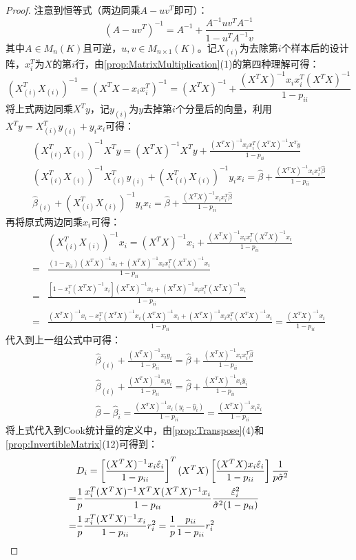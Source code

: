 \begin{proof}
	注意到恒等式（两边同乘$A-uv^T$即可）：
	\begin{equation*}
		(A-uv^T)^{-1}=A^{-1}+\frac{A^{-1}uv^TA^{-1}}{1-u^TA^{-1}v}
	\end{equation*}
	其中$A\in M_{n}(K)$且可逆，$u,v\in M_{n\times 1}(K)$。记$X_{(i)}$为去除第$i$个样本后的设计阵，$x_i^T$为$X$的第$i$行，由\cref{prop:MatrixMultiplication}(1)的第四种理解可得：
	\begin{equation*}
		(X_{(i)}^TX_{(i)})^{-1}=(X^TX-x_ix_i^T)^{-1}=(X^TX)^{-1}+\frac{(X^TX)^{-1}x_ix_i^T(X^TX)^{-1}}{1-p_{ii}}
	\end{equation*}
	将上式两边同乘$X^Ty$，记$y_{(i)}$为$y$去掉第$i$个分量后的向量，利用$X^Ty=X_{(i)}^Ty_{(i)}+y_ix_i$可得：
	\begin{gather*}
		(X_{(i)}^TX_{(i)})^{-1}X^Ty=(X^TX)^{-1}X^Ty+\frac{(X^TX)^{-1}x_ix_i^T(X^TX)^{-1}X^Ty}{1-p_{ii}} \\
		(X_{(i)}^TX_{(i)})^{-1}X_{(i)}^Ty_{(i)}+(X_{(i)}^TX_{(i)})^{-1}y_ix_i=\hat{\beta}+\frac{(X^TX)^{-1}x_ix_i^T\hat{\beta}}{1-p_{ii}} \\
		\hat{\beta}_{(i)}+(X_{(i)}^TX_{(i)})^{-1}y_ix_i=\hat{\beta}+\frac{(X^TX)^{-1}x_ix_i^T\hat{\beta}}{1-p_{ii}}
	\end{gather*}
	再将原式两边同乘$x_i$可得：
	\begin{align*}
		&(X_{(i)}^TX_{(i)})^{-1}x_i=(X^TX)^{-1}x_i+\frac{(X^TX)^{-1}x_ix_i^T(X^TX)^{-1}x_i}{1-p_{ii}} \\
		=&\frac{(1-p_{ii})(X^TX)^{-1}x_i+(X^TX)^{-1}x_ix_i^T(X^TX)^{-1}x_i}{1-p_{ii}} \\
		=&\frac{[1-x_i^T(X^TX)^{-1}x_i](X^TX)^{-1}x_i+(X^TX)^{-1}x_ix_i^T(X^TX)^{-1}x_i}{1-p_{ii}} \\
		=&\frac{(X^TX)^{-1}x_i-x_i^T(X^TX)^{-1}x_i(X^TX)^{-1}x_i+(X^TX)^{-1}x_ix_i^T(X^TX)^{-1}x_i}{1-p_{ii}}=\frac{(X^TX)^{-1}x_i}{1-p_{ii}}
	\end{align*}
	代入到上一组公式中可得：
	\begin{gather*}
		\hat{\beta}_{(i)}+\frac{(X^TX)^{-1}x_iy_i}{1-p_{ii}}=\hat{\beta}+\frac{(X^TX)^{-1}x_ix_i^T\hat{\beta}}{1-p_{ii}} \\
		\hat{\beta}_{(i)}+\frac{(X^TX)^{-1}x_iy_i}{1-p_{ii}}=\hat{\beta}+\frac{(X^TX)^{-1}x_i\hat{y}_i}{1-p_{ii}} \\
		\hat{\beta}-\hat{\beta}_i=\frac{(X^TX)^{-1}x_i(y_i-\hat{y}_i)}{1-p_{ii}}=\frac{(X^TX)^{-1}x_i\hat{\varepsilon}_i}{1-p_{ii}} 
	\end{gather*}
	将上式代入到Cook统计量的定义中，由\cref{prop:Transpose}(4)和\cref{prop:InvertibleMatrix}(12)可得到：
	\begin{align*}
		&D_i=\left[\frac{(X^TX)^{-1}x_i\hat{\varepsilon}_i}{1-p_{ii}}\right]^T(X^TX)\left[\frac{(X^TX)x_i\hat{\varepsilon}_i}{1-p_{ii}}\right]\frac{1}{p\hat{\sigma}^2} \\
		=&\frac{1}{p}\frac{x_i^T(X^TX)^{-1}X^TX(X^TX)^{-1}x_i}{1-p_{ii}}\frac{\hat{\varepsilon}_i^2}{\hat{\sigma}^2(1-p_{ii})} \\
		=&\frac{1}{p}\frac{x_i^T(X^TX)^{-1}x_i}{1-p_{ii}}r_i^2=\frac{1}{p}\frac{p_{ii}}{1-p_{ii}}r_i^2\qedhere
	\end{align*}
\end{proof}
